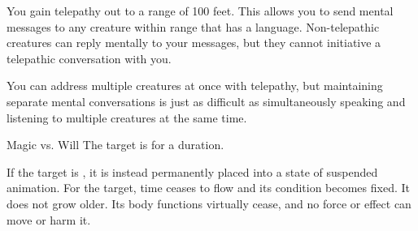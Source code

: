 \begin{spellheader}
    \spelldur{\durlong}
\end{spellheader}
\begin{spelleffects}
    \spelleffect You gain telepathy out to a range of 100 feet. This allows you to send mental messages to any creature within range that has a language. Non-telepathic creatures can reply mentally to your messages, but they cannot initiative a telepathic conversation with you.

    You can address multiple creatures at once with telepathy, but maintaining separate mental conversations is just as difficult as simultaneously speaking and listening to multiple creatures at the same time. 
\end{spelleffects}
\begin{spellfooter}

\end{spellfooter}

\begin{spellheader}
\end{spellheader}
\begin{spelleffects}
    \begin{spellattack}{Magic vs. Will}
        \spellsuccess The target is \slowed for a \durlong duration.

        If the target is \bloodied, it is instead permanently placed into a state of suspended animation. For the target, time ceases to flow and its condition becomes fixed. It does not grow older. Its body functions virtually cease, and no force or effect can move or harm it.
    \end{spellattack}
\end{spelleffects}
\begin{spellfooter}

\end{spellfooter}


